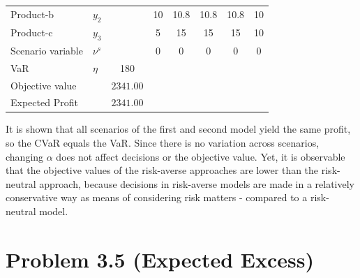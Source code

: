 \documentclass[7pt]{article}
\begin{document}
\begin{table}[h!]
\begin{tabular}{ll|c|ccccc}
        Product-b             & $y_2$                                      &                 & 10           & 10.8              & 10.8          & 10.8             & 10            \\
        Product-c             & $y_3$                                      &                 & 5            & 15                & 15            & 15               & 10            \\
        Scenario variable     & $\nu^s$                                    &                 & 0            & 0                 & 0             & 0                & 0             \\
        VaR                   & $\eta$                                     & 180             &              &                   &               &                  &               \\
        Objective value       &                                            & $2341.00$       &                                                                                     \\
        Expected Profit       &                                            & $2341.00$       &                                                                                     \\
        \bottomrule
    \end{tabular}
\end{table}

It is shown that all scenarios of the first and second model yield the same
profit, so the CVaR equals the VaR. Since there is no variation across
scenarios, changing $\alpha$ does not affect decisions or the objective value.
Yet, it is observable that the objective values of the risk-averse approaches
are lower than the risk-neutral approach, because decisions in risk-averse
models are made in a relatively conservative way as means of considering risk
matters - compared to a risk-neutral model.

\section{Problem 3.5 (Expected Excess)}
\end{document}
